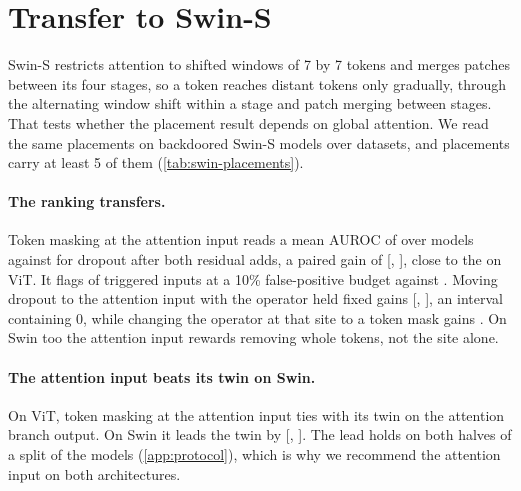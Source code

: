 \section{Transfer to Swin-S}
\label{sec:swin}

Swin-S \cite{liu2021swin} restricts attention to shifted windows of 7 by 7 tokens and merges patches between its four stages, so a token reaches distant tokens only gradually, through the alternating window shift within a stage and patch merging between stages. That tests whether the placement result depends on global attention. We read the same placements on \SwinCells{} backdoored Swin-S models over \SwinDatasets{} datasets, and \SwinPlacementsReported{} placements carry at least 5 of them (\cref{tab:swin-placements}).



\paragraph{The ranking transfers.}
Token masking at the attention input reads a mean AUROC of \SwinRecommendedAurocAdaptive{} over \SwinRecommendedN{} models against \SwinPublishedAurocAdaptive{} for dropout after both residual adds, a paired gain of \SwinGainRecommendedMinusPublished{} [\SwinGainRecommendedMinusPublishedLow{}, \SwinGainRecommendedMinusPublishedHigh{}], close to the \HeadlineGainAdaptiveAuroc{} on ViT. It flags \SwinRecommendedTprOneZero{} of triggered inputs at a 10\% false-positive budget against \SwinPublishedTprOneZero{}. Moving dropout to the attention input with the operator held fixed gains \SwinGainDropoutInputMinusPublished{} [\SwinGainDropoutInputMinusPublishedLow{}, \SwinGainDropoutInputMinusPublishedHigh{}], an interval containing 0, while changing the operator at that site to a token mask gains \SwinGainRecommendedMinusSameSiteDropout{}. On Swin too the attention input rewards removing whole tokens, not the site alone.

\paragraph{The attention input beats its twin on Swin.}
On ViT, token masking at the attention input ties with its twin on the attention branch output. On Swin it leads the twin by \SwinGainRecommendedMinusTwin{} [\SwinGainRecommendedMinusTwinLow{}, \SwinGainRecommendedMinusTwinHigh{}]. The lead holds on both halves of a split of the models (\cref{app:protocol}), which is why we recommend the attention input on both architectures.

